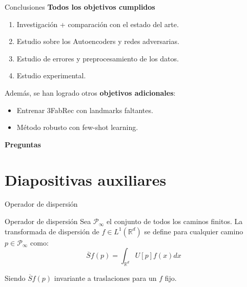 \documentclass[aspectratio=43]{beamer}
\begin{document}
\begin{frame}[t]{Conclusiones}
  \normalsize \textbf{Todos los objetivos cumplidos}
  \begin{enumerate}
    \item \small Investigación + comparación con el estado del arte.
    \item \small Estudio sobre los Autoencoders y redes adversarias.
    \item \small Estudio de errores y preprocesamiento de los datos.
    \item \small Estudio experimental.
  \end{enumerate}

  \medskip

  \normalsize Además, se han logrado otros \textbf{objetivos adicionales}:
  \begin{itemize}
    \item \small Entrenar 3FabRec con landmarks faltantes.
    \item \small Método robusto con few-shot learning.
  \end{itemize}
\end{frame}


\begin{frame}[c]{}
  \Huge \centering \textcolor{tudCyan}{\textbf{Preguntas}}
\end{frame}

\part{Diapositivas auxiliares}

\begin{frame}{Operador de dispersión}
  \begin{alertblock}{Operador de dispersión}
    Sea $\mathcal{P}_\infty$ el conjunto de todos los caminos finitos. La transformada de dispersión de $f \in L^1(\mathbb{R}^d)$ se define para cualquier camino $p \in \mathcal{P}_\infty$ como:
    \begin{equation*}
      \overline{S}f(p)=\int_{\mathbb{R}^d}U[p]f(x)dx
    \end{equation*}
  \end{alertblock}

  Siendo $\overline{S}f(p)$ invariante a traslaciones para un $f$ fijo.
\end{frame}
\end{document}
